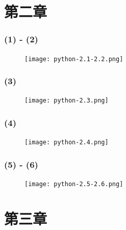 \documentclass{beamer}
\begin{document}
  \section{第二章}
  \begin{frame}[fragile]
    \frametitle{(1) - (2)}
    \begin{figure}[!htb] %
      \texttt{[image: python-2.1-2.2.png]} %
    \end{figure}
  \end{frame}
  \begin{frame}[fragile]
    \frametitle{(3)}
    \begin{figure}[!htb] %
      \texttt{[image: python-2.3.png]} %
    \end{figure}
  \end{frame}
  \begin{frame}[fragile]
    \frametitle{(4)}
    \begin{figure}[!htb] %
      \texttt{[image: python-2.4.png]} %
    \end{figure}
  \end{frame}
  \begin{frame}[fragile]
    \frametitle{(5) - (6)}
    \begin{figure}[!htb] %
      \texttt{[image: python-2.5-2.6.png]} %
    \end{figure}
  \end{frame}

  \section{第三章}
\end{document}
